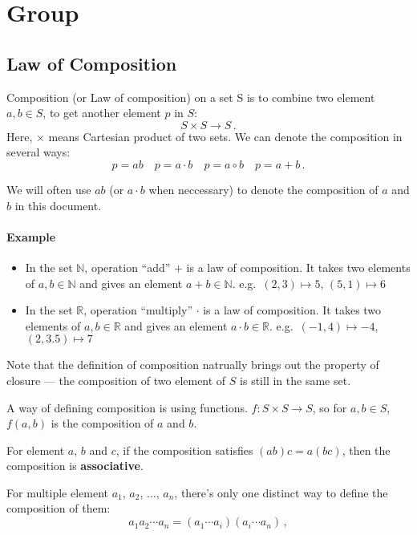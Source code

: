 \documentclass[UTF8]{ctexart}
\theoremstyle{mystyle}
\theoremstyle{myremark}
\theoremstyle{plain}
\newcommand{\R}{\mathbb R}
\newcommand{\N}{\mathbb N}
\begin{document}
\section{Group}
\subsection{Law of Composition}
\begin{definition}
    Composition (or Law of composition) on a set S is to combine two element $ a, b \in S $, to get another element $ p $ in $ S $: \[ S \times S \to S \,.\] Here, $ \times $ means Cartesian product of two sets. We can denote the composition in several ways: \[ p = a b \quad p = a \cdot b \quad p = a \circ b \quad p = a + b \,.\]
\end{definition}

We will often use $ ab $ (or $ a \cdot b $ when neccessary) to denote the composition of $ a $ and $ b $ in this document.

\paragraph{Example}
\begin{itemize}
    \item In the set $ \N $, operation ``add'' $ + $ is a law of composition. It takes two elements of $ a, b \in \N $ and gives an element $ a + b \in \N $. e.g.\ $ (2, 3) \mapsto 5 $, $ (5, 1) \mapsto 6 $
    \item In the set $ \R $, operation ``multiply'' $ \cdot $ is a law of composition. It takes two elements of $ a, b \in \R $ and gives an element $ a \cdot b \in \R $. e.g.\ $ (-1, 4) \mapsto -4 $, $ (2, 3.5) \mapsto 7 $
\end{itemize}

Note that the definition of composition natrually brings out the property of closure --- the composition of two element of $ S $ is still in the same set.

A way of defining composition is using functions. $ f \colon S \times S \to S $, so for $ a, b \in S $, $ f(a, b) $ is the composition of $ a $ and $ b $.

\begin{definition}
    For element $ a $, $ b $ and $ c $, if the composition satisfies $ (ab)c = a(bc) $, then the composition is \textbf{associative}.
\end{definition}

For multiple element $ a_1 $, $ a_2 $, $ \dots $, $ a_n $, there's only one distinct way to define the composition of them:
\[ a_1 a_2 \cdots a_n = (a_1 \cdots a_i) (a_i \cdots a_n) \,,\]
\end{document}
